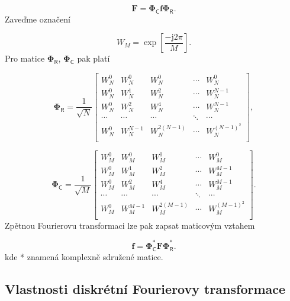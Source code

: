 \begin{equation} \label{eq:2_41}
    \mathbf{F} = \mathbf{\Phi}_{\mathsf{C}} \mathbf{f} \mathbf{\Phi}_{\mathsf{R}}.
\end{equation}
Zaveďme označení

\begin{equation} \label{eq:2_42}
    W_M = \exp \left[ \frac{ - \mathrm{j} 2 \pi}{M} \right].
\end{equation}
Pro matice $\mathbf{\Phi}_{\mathsf{R}}$, $\mathbf{\Phi}_{\mathsf{C}}$ pak platí

\begin{equation} \label{eq:2_43} 
    \mathbf{\Phi}_{\mathsf{R}} = \frac{1}{\sqrt{N}} \left[
    \begin{array}{ccccc}
    W_N^0 & W_N^0 & W_N^0 & \cdots & W_N^0\\
    W_N^0 & W_N^1 & W_N^2 & \cdots & W_N^{N-1} \\
    W_N^0 & W_N^2 & W_N^4 & \cdots & W_N^{N-1} \\
    \cdots & \cdots & \cdots & \ddots & \cdots \\
    W_N^0 & W_N^{N-1} & W_N^{2(N-1)} & \cdots & W_N^{(N-1)^2} \\
    \end{array}\right],
\end{equation} 

\begin{equation} \label{eq:2_44} 
    \mathbf{\Phi}_{\mathsf{C}} = \frac{1}{\sqrt{M}} \left[
    \begin{array}{ccccc}
    W_M^0 & W_M^0 & W_M^0 & \cdots & W_M^0\\
    W_M^0 & W_M^1 & W_M^2 & \cdots & W_M^{M-1} \\
    W_M^0 & W_M^2 & W_M^4 & \cdots & W_M^{M-1} \\
    \cdots & \cdots & \cdots & \ddots & \cdots \\
    W_M^0 & W_M^{M-1} & W_M^{2(M-1)} & \cdots & W_M^{(M-1)^2} \\
    \end{array}\right].
\end{equation} 
Zpětnou Fourierovu transformaci lze pak zapsat maticovým vztahem

\begin{equation} \label{eq:2_45}
    \mathbf{f} = \mathbf{\Phi}_{\mathsf{C}}^* \mathbf{F} \mathbf{\Phi}_{\mathsf{R}}^*.
\end{equation}
kde * znamená komplexně sdružené matice.

\subsection*{Vlastnosti diskrétní Fourierovy transformace}

